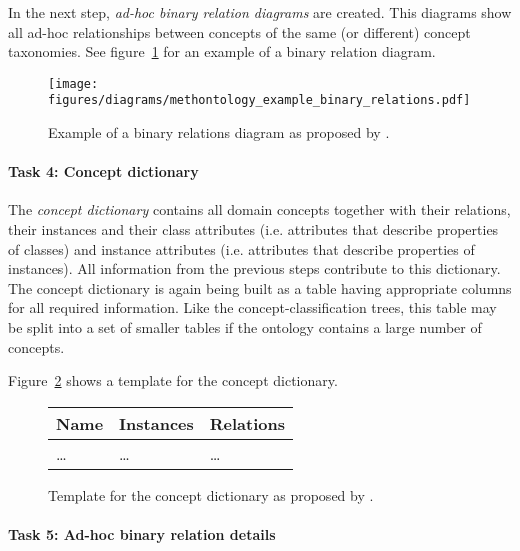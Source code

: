 In the next step, \emph{ad-hoc binary relation diagrams} are created. This diagrams show all ad-hoc relationships between concepts of the same (or different) concept taxonomies. See figure~\ref{fig:methontology_example_binary_relations} for an example of a binary relation diagram.

\begin{figure}
\centering
\texttt{[image: figures/diagrams/methontology\_example\_binary\_relations.pdf]}
\caption{Example of a binary relations diagram as proposed by \methontology.}
\label{fig:methontology_example_binary_relations}
\end{figure}

\paragraph{Task 4: Concept dictionary}

The \emph{concept dictionary} contains all domain concepts together with their relations, their instances and their class attributes (i.e. attributes that describe properties of classes) and instance attributes (i.e. attributes that describe properties of instances). All information from the previous steps contribute to this dictionary. The concept dictionary is again being built as a table having appropriate columns for all required information. Like the concept-classification trees, this table may be split into a set of smaller tables if the ontology contains a large number of concepts.

Figure~\ref{fig:methontology_example_concept_dictionary} shows a template for the concept dictionary.

\begin{figure}
\centering
\begin{tabular}{|p{}|p{}|p{}|}
  \hline
  \textbf{Name} & \textbf{Instances} & \textbf{Relations} \\
  \hline\hline
  … & … & … \\
  \hline
\end{tabular}
\caption{Template for the concept dictionary as proposed by \methontology.}
\label{fig:methontology_example_concept_dictionary}
\end{figure}

\paragraph{Task 5: Ad-hoc binary relation details}

